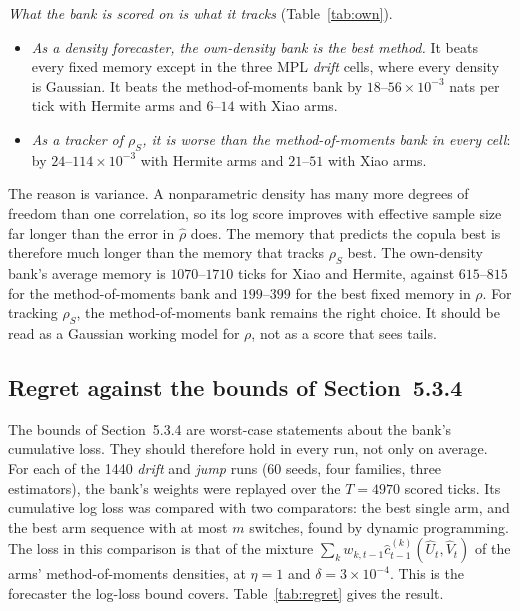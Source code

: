 \emph{What the bank is scored on is what it tracks} (Table~\ref{tab:own}).
\begin{itemize}
  \item \emph{As a density forecaster, the own-density bank is the best method.} It beats every
    fixed memory except in the three MPL \emph{drift} cells, where every density is Gaussian. It
    beats the method-of-moments bank by $18$--$56\times10^{-3}$ nats per tick with Hermite arms and
    $6$--$14$ with Xiao arms.
  \item \emph{As a tracker of $\rho_S$, it is worse than the method-of-moments bank in every
    cell}: by $24$--$114\times10^{-3}$ with Hermite arms and $21$--$51$ with Xiao arms.
\end{itemize}
The reason is variance. A nonparametric density has many more degrees of freedom than one
correlation, so its log score improves with effective sample size far longer than the error in
$\hat\rho$ does. The memory that predicts the copula best is therefore much longer than the memory
that tracks $\rho_S$ best. The own-density bank's average memory is $1070$--$1710$ ticks for Xiao
and Hermite, against $615$--$815$ for the method-of-moments bank and $199$--$399$ for the best
fixed memory in $\rho$. For tracking $\rho_S$, the method-of-moments bank remains the right
choice. It should be read as a Gaussian working model for $\rho$, not as a score that sees tails.

\subsection{Regret against the bounds of Section~5.3.4}
\label{sec:regret}

The bounds of Section~5.3.4 are worst-case statements about the bank's cumulative loss. They should
therefore hold in every run, not only on average. For each of the 1440 \emph{drift} and \emph{jump}
runs (60 seeds, four families, three estimators), the bank's weights were replayed over the
$T=4970$ scored ticks. Its cumulative log loss was compared with two comparators: the best single
arm, and the best arm sequence with at most $m$ switches, found by dynamic programming. The loss
in this comparison is that of the mixture $\sum_k w_{k,t-1}\hat c^{(k)}_{t-1}(\hat U_t,\hat V_t)$ of the
arms' method-of-moments densities, at $\eta=1$ and $\delta=3\times10^{-4}$. This is the forecaster
the log-loss bound covers. Table~\ref{tab:regret} gives the result.

